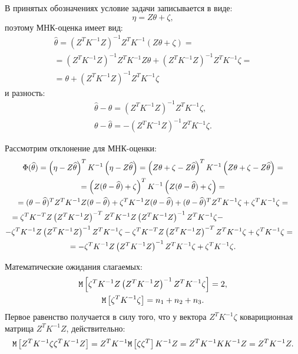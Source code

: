 В принятых обозначениях условие задачи записывается в виде:
\begin{equation}
    \eta = Z \theta + \zeta ,
\end{equation}
поэтому МНК-оценка имеет вид:
\begin{multline}
    \widehat{\theta}
    = \left ( Z^T K^{-1} Z \right )^{-1} Z^T K^{-1} \left ( Z \theta + \zeta \right ) = \\
    = \left ( Z^T K^{-1} Z \right )^{-1} Z^T K^{-1} Z \theta + \left ( Z^T K^{-1} Z \right )^{-1} Z^T K^{-1} \zeta = \\
    = \theta + \left ( Z^T K^{-1} Z \right )^{-1} Z^T K^{-1} \zeta
\end{multline}
и разность:
\begin{gather}
    \widehat{\theta} - \theta = \left ( Z^T K^{-1} Z \right )^{-1} Z^T K^{-1} \zeta , \\
    \theta - \widehat{\theta} = - \left ( Z^T K^{-1} Z \right )^{-1} Z^T K^{-1} \zeta .
\end{gather}

Рассмотрим отклонение для МНК-оценки:
\begin{multline}
    \Phi(\widehat{\theta})
    = \left ( \eta - Z \widehat{\theta} \right )^T K^{-1} \left ( \eta - Z \widehat{\theta} \right )
    = \left ( Z \theta + \zeta - Z \widehat{\theta} \right )^T K^{-1} \left ( Z \theta + \zeta - Z \widehat{\theta} \right ) = \\
    = \left ( Z ( \theta - \widehat{\theta} ) + \zeta \right )^T K^{-1} \left ( Z ( \theta - \widehat{\theta} ) + \zeta \right ) = \\
    = ( \theta - \widehat{\theta} )^T Z^T K^{-1} Z ( \theta - \widehat{\theta} ) + \zeta^T K^{-1} Z ( \theta - \widehat{\theta} ) + ( \theta - \widehat{\theta} )^T Z^T K^{-1} \zeta + \zeta^T K^{-1} \zeta = \\
    \shoveleft{= \zeta^T K^{-T} Z \left ( Z^T K^{-1} Z \right )^{-T} Z^T K^{-1} Z \left ( Z^T K^{-1} Z \right )^{-1} Z^T K^{-1} \zeta -} \\
    \shoveright{- \zeta^T K^{-1} Z \left ( Z^T K^{-1} Z \right )^{-1} Z^T K^{-1} \zeta - \zeta^T K^{-T} Z \left ( Z^T K^{-1} Z \right )^{-T} Z^T K^{-1} \zeta + \zeta^T K^{-1} \zeta =} \\
    = - \zeta^T K^{-1} Z \left ( Z^T K^{-1} Z \right )^{-1} Z^T K^{-1} \zeta + \zeta^T K^{-1} \zeta .
\end{multline}

Математические ожидания слагаемых:
\begin{gather}
    \mathtt{M} \left [ \zeta^T K^{-1} Z \left ( Z^T K^{-1} Z \right )^{-1} Z^T K^{-1} \zeta \right ] = 2 , \\
    \mathtt{M} \left [ \zeta^T K^{-1} \zeta \right ] = n_1 + n_2 + n_3 .
\end{gather}
Первое равенство получается в силу того, что у вектора $Z^T K^{-1} \zeta$ ковариционная матрица $Z^T K^{-1} Z$, действительно:
\begin{equation}
    \mathtt{M} \left [ Z^T K^{-1} \zeta \zeta^T K^{-1} Z \right ]
    = Z^T K^{-1} \mathtt{M} \left [ \zeta \zeta^T \right ] K^{-1} Z
    = Z^T K^{-1} K K^{-1} Z
    = Z^T K^{-1} Z .
\end{equation}

